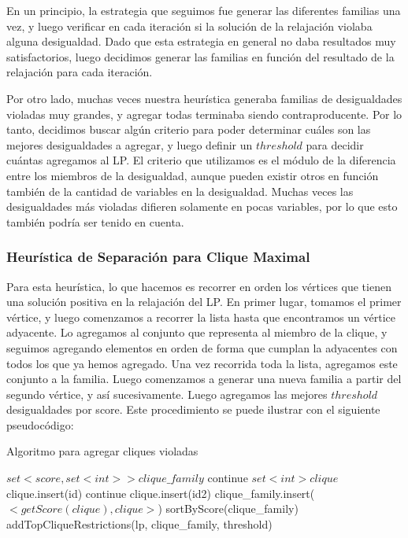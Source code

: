 En un principio, la estrategia que seguimos fue generar las diferentes familias una vez, y luego verificar en cada iteración si la solución de la relajación violaba alguna desigualdad. Dado que esta estrategia en general no daba resultados muy satisfactorios, luego decidimos generar las familias en función del resultado de la relajación para cada iteración.

Por otro lado, muchas veces nuestra heurística generaba familias de desigualdades violadas muy grandes, y agregar todas terminaba siendo contraproducente. Por lo tanto, decidimos buscar algún criterio para poder determinar cuáles son las mejores desigualdades a agregar, y luego definir un $threshold$ para decidir cuántas agregamos al LP. El criterio que utilizamos es el módulo de la diferencia entre los miembros de la desigualdad, aunque pueden existir otros en función también de la cantidad de variables en la desigualdad. Muchas veces las desigualdades más violadas difieren solamente en pocas variables, por lo que esto también podría ser tenido en cuenta.

\subsubsection{Heurística de Separación para Clique Maximal}

Para esta heurística, lo que hacemos es recorrer en orden los vértices que tienen una solución positiva en la relajación del LP. En primer lugar, tomamos el primer vértice, y luego comenzamos a recorrer la lista hasta que encontramos un vértice adyacente. Lo agregamos al conjunto que representa al miembro de la clique, y seguimos agregando elementos en orden de forma que cumplan la adyacentes con todos los que ya hemos agregado. Una vez recorrida toda la lista, agregamos este conjunto a la familia. Luego comenzamos a generar una nueva familia a partir del segundo vértice, y así sucesivamente. Luego agregamos las mejores $threshold$ desigualdades por score. Este procedimiento se puede ilustrar con el siguiente pseudocódigo:

\begin{algorithm}
\caption{Algoritmo para agregar cliques violadas}
\begin{algorithmic}[1]
\State $set<score, set<int>> clique\_family$
		\State continue
	\EndIf
	\State $set<int> clique$
	\State clique.insert(id)
			\State continue
		\EndIf
			\State clique.insert(id2)
		\EndIf
	\EndFor
		\State clique\_family.insert($<getScore(clique), clique>$)
	\EndIf
\EndFor
\State sortByScore(clique\_family)
\State addTopCliqueRestrictions(lp, clique\_family, threshold)
\EndProcedure
\end{algorithmic}
\end{algorithm}

